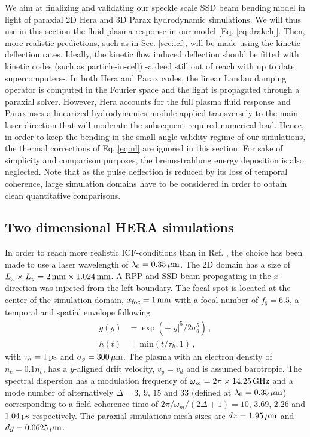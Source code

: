 \documentclass[%
 reprint,
 amsmath,amssymb,
 aps,
]{revtex4-1}
\begin{document}
We aim  at finalizing  and validating our speckle scale SSD beam bending model in light of paraxial 2D  Hera \cite[]{HERA_Jourdren_2005,Loiseau_2006} and 3D Parax  \cite[]{POP_Riazuelo_2000} hydrodynamic simulations. We will thus use in this section the fluid plasma response in our model [Eq. \eqref{eq:drakeh}]. Then, more realistic  predictions, such as in Sec. \ref{sec:icf}, will be made using the kinetic deflection rates. 
Ideally, the kinetic flow induced deflection should be fitted with kinetic  codes (such as particle-in-cell) -a deed still out of reach with up to date supercomputers-.
In both Hera and Parax codes, the linear Landau damping operator is computed in the Fourier space \cite[]{Berger_98,POP_Rose_96,Masson_2006}   and the light is propagated through a paraxial solver.
However, Hera accounts for the full plasma fluid response and Parax uses a linearized hydrodynamics module applied transversely to the main laser direction that will moderate the subsequent required numerical load. 
Hence, in order to keep the bending in the small angle validity regime of our simulations,  the thermal corrections of Eq. \eqref{eq:nl} are ignored in this section. 
For sake of simplicity and comparison purposes, the bremsstrahlung energy deposition is also neglected. Note that as the pulse deflection is reduced by its loss of temporal coherence,  large simulation domains have to be considered in order to obtain clean quantitative comparisons.

\subsection{Two dimensional HERA simulations }
\label{sec:hera2d}
In order to reach more realistic ICF-conditions than in Ref. \cite[]{POP_Ruyer_2020}, the choice has been made to use a laser wavelength of $\lambda_0=0.35\, \rm\mu m$.
The 2D domain has a size of  $L_x\times L_y = 2\, \rm{mm} \times 1.024\, \rm{mm}$.
A RPP and SSD beam  propagating in the $x$-direction was injected from the left boundary.
The focal spot is located at the center of the simulation domain, $x_\mathrm{foc}=1\, \rm mm$ with a focal number of $f_\sharp = 6.5$, a temporal
and spatial envelope following
\begin{align}
    g(y) &= \exp(-\vert y\vert ^ 5/2\sigma_g^{ 5}) %
    \label{eq:g}\, ,\\
    h(t) &= \mathrm{min}(t/\tau_h,1) \, ,\label{eq:h}
\end{align}
with $\tau_h=1\, \rm ps$ and $\sigma_g = 300\,\rm \mu m$. 
The plasma with an electron density of $n_e =0.1n_c $, has a $y$-aligned drift velocity, $v_y=v_d$ and is assumed barotropic.
The  spectral dispersion  has a modulation frequency of  $\omega_m = 2\pi\times 14.25\,\rm GHz$ and a mode number of alternatively $
\Delta =3$, $9$, $15$ and $33$ (defined at $\lambda_0=0.35\,\rm\mu m$) corresponding to a field coherence time of 
$2\pi/\omega_m/(2\Delta+1) =10$, $3.69$, $2.26$ and  $1.04 \,\rm ps$ respectively. 
The paraxial simulations mesh sizes are $dx = 1.95\, \rm \mu m$ and $dy =0.0625\, \rm \mu m$.  
\end{document}
